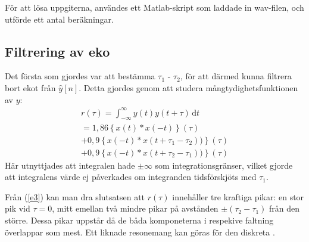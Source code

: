 \documentclass[10pt,twocolumn,a4paper]{article}
\begin{document}
För att lösa uppgiterna, användes ett Matlab-skript som laddade in wav-filen,
och utförde ett antal beräkningar.
\subsection{Filtrering av eko}

Det första som gjordes var att bestämma $\tau_1$ - $\tau_2$, för att därmed
kunna filtrera bort ekot från $\hat{y}[n]$. Detta gjordes genom att studera
mångtydighetsfunktionen av $y$:
\begin{multline}
    r(\tau) = \int_{-\infty}^{\infty}\!y(t)y(t+\tau)\, \mathrm{d}t \\ 
    = 1,86\left\{x(t) \ast x(-t)\right\}(\tau)\\ + 
    0,9\left\{x(-t) \ast x(t+\tau_1-\tau_2))\right\}(\tau)\\ + 
    0,9\left\{x(-t) \ast x(t+\tau_2-\tau_1))\right\}(\tau)
    \label{e3}
\end{multline}
Här utnyttjades att integralen hade $\pm\infty$ som integrationsgränser,
vilket gjorde att integralens värde ej påverkades om integranden
tidsförskjöts med $\tau_1$.

Från (\ref{e3}) kan man dra slutsatsen att $r(\tau)$ innehåller tre
kraftiga pikar: en stor pik vid $\tau=0$, mitt emellan två mindre
pikar på avstånden $\pm(\tau_2 - \tau_1)$ från den större. Dessa pikar uppstår
då de båda komponeterna i respekive faltning överlappar som mest. Ett liknade
resonemang kan göras för den diskreta \yhat.
\end{document}
